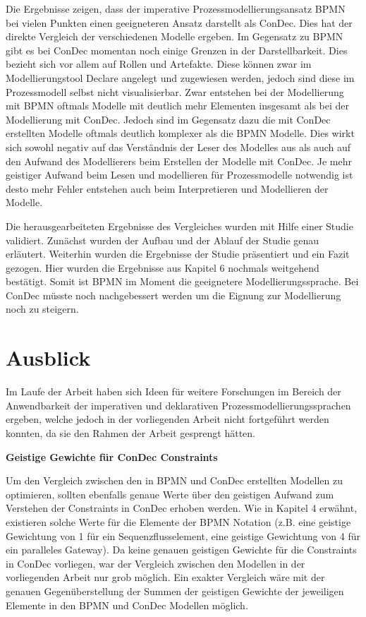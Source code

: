 Die Ergebnisse zeigen, dass der imperative Prozessmodellierungsansatz BPMN bei vielen Punkten einen geeigneteren Ansatz darstellt als ConDec. Dies hat der direkte Vergleich der verschiedenen Modelle ergeben. Im Gegensatz zu BPMN gibt es bei ConDec momentan noch einige Grenzen in der Darstellbarkeit. Dies bezieht sich vor allem auf Rollen und Artefakte. Diese können zwar im Modellierungstool Declare angelegt und zugewiesen werden, jedoch sind diese im Prozessmodell selbst nicht visualisierbar. Zwar entstehen bei der Modellierung mit BPMN oftmals Modelle mit deutlich mehr Elementen insgesamt als bei der Modellierung mit ConDec. Jedoch sind im Gegensatz dazu die mit ConDec erstellten Modelle oftmals deutlich komplexer als die BPMN Modelle. Dies wirkt sich sowohl negativ auf das Verständnis der Leser des Modelles aus als auch auf den Aufwand des Modellierers beim Erstellen der Modelle mit ConDec. Je mehr geistiger Aufwand beim Lesen und modellieren für Prozessmodelle notwendig ist desto mehr Fehler entstehen auch beim Interpretieren und Modellieren der Modelle. \newline

Die herausgearbeiteten Ergebnisse des Vergleiches wurden mit Hilfe einer Studie validiert. Zunächst wurden der Aufbau und der Ablauf der Studie genau erläutert. Weiterhin wurden die Ergebnisse der Studie präsentiert und ein Fazit gezogen. Hier wurden die Ergebnisse aus Kapitel 6 nochmals weitgehend bestätigt. Somit ist BPMN im Moment die geeignetere Modellierungssprache. Bei ConDec müsste noch nachgebessert werden um die Eignung zur Modellierung noch zu steigern.\newline


\section{Ausblick}

Im Laufe der Arbeit haben sich Ideen für weitere Forschungen im Bereich der Anwendbarkeit der imperativen und deklarativen Prozessmodellierungssprachen ergeben, welche jedoch in der vorliegenden Arbeit nicht fortgeführt werden konnten, da sie den Rahmen der Arbeit gesprengt hätten.\newline

\textbf{Geistige Gewichte für ConDec Constraints}

Um den Vergleich zwischen den in BPMN und ConDec erstellten Modellen zu optimieren, sollten ebenfalls genaue Werte über den geistigen Aufwand zum Verstehen der Constraints in ConDec erhoben werden. Wie in Kapitel 4 erwähnt, existieren solche Werte für die Elemente der BPMN Notation (z.B. eine geistige Gewichtung von 1 für ein Sequenzflusselement, eine geistige Gewichtung von 4 für ein paralleles Gateway). Da keine genauen geistigen Gewichte für die Constraints in ConDec vorliegen, war der Vergleich zwischen den Modellen in der vorliegenden Arbeit nur grob möglich. Ein exakter Vergleich wäre mit der genauen Gegenüberstellung der Summen der geistigen Gewichte der jeweiligen Elemente in den BPMN und ConDec Modellen möglich.\newline


